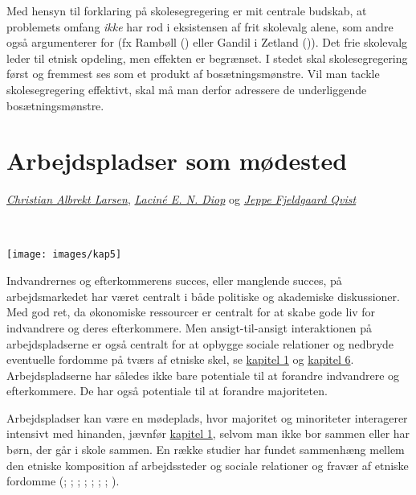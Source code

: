 \documentclass[
]{book}
\begin{document}
Med hensyn til forklaring på skolesegregering er mit centrale budskab, at problemets omfang \emph{ikke} har rod i eksistensen af frit skolevalg alene, som andre også argumenterer for (fx Rambøll () eller Gandil i Zetland ()). Det frie skolevalg leder til etnisk opdeling, men effekten er begrænset. I stedet skal skolesegregering først og fremmest ses som et produkt af bosætningsmønstre. Vil man tackle skolesegregering effektivt, skal må man derfor adressere de underliggende bosætningsmønstre.

\newpage
\thispagestyle{empty}

\chapter{Arbejdspladser som mødested}\label{kap5}

\thispagestyle{empty}

\emph{\href{https://vbn.aau.dk/en/persons/albrekt}{Christian Albrekt Larsen}}, \emph{\href{https://vbn.aau.dk/en/persons/led}{Laciné E. N. Diop}} og \emph{\href{https://vbn.aau.dk/da/persons/jeppefl}{Jeppe Fjeldgaard Qvist}}

~~~~

\texttt{[image: images/kap5]}

\newpage

Indvandrernes og efterkommerens succes, eller manglende succes, på arbejdsmarkedet har været centralt i både politiske og akademiske diskussioner. Med god ret, da økonomiske ressourcer er centralt for at skabe gode liv for indvandrere og deres efterkommere. Men ansigt-til-ansigt interaktionen på arbejdspladserne er også centralt for at opbygge sociale relationer og nedbryde eventuelle fordomme på tværs af etniske skel, se \hyperref[kap1]{kapitel 1} og \hyperref[kap6]{kapitel 6}. Arbejdspladserne har således ikke bare potentiale til at forandre indvandrere og efterkommere. De har også potentiale til at forandre majoriteten.

Arbejdspladser kan være en mødeplads, hvor majoritet og minoriteter interagerer intensivt med hinanden, jævnfør \hyperref[kap1]{kapitel 1}, selvom man ikke bor sammen eller har børn, der går i skole sammen. En række studier har fundet sammenhæng mellem den etniske komposition af arbejdssteder og sociale relationer og fravær af etniske fordomme (; ; ; ; ; ; ; ).
\end{document}
